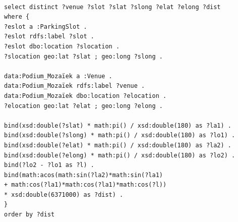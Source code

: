 \documentclass[runningheads,a4paper]{../../StyleFiles/llncs}
\begin{document}
\begin{lstlisting}[captionpos=b, caption=SPARQL query for getting parking spots close to Podium Mozaiek (sorted by distance), label=lst:sparql,
basicstyle=\ttfamily\small,frame=bt]

select distinct ?venue ?slot ?slat ?slong ?elat ?elong ?dist
where {
?eslot a :ParkingSlot .
?eslot rdfs:label ?slot .
?eslot dbo:location ?slocation .
?slocation geo:lat ?slat ; geo:long ?slong .

data:Podium_Mozaïek a :Venue .
data:Podium_Mozaïek rdfs:label ?venue .
data:Podium_Mozaïek dbo:location ?elocation .
?elocation geo:lat ?elat ; geo:long ?elong .

bind(xsd:double(?slat) * math:pi() / xsd:double(180) as ?la1) .
bind(xsd:double(?slong) * math:pi() / xsd:double(180) as ?lo1) .
bind(xsd:double(?elat) * math:pi() / xsd:double(180) as ?la2) .
bind(xsd:double(?elong) * math:pi() / xsd:double(180) as ?lo2) .
bind(?lo2 - ?lo1 as ?l) .
bind(math:acos(math:sin(?la2)*math:sin(?la1) 
+ math:cos(?la1)*math:cos(?la1)*math:cos(?l)) 
* xsd:double(6371000) as ?dist) .
}
order by ?dist

\end{lstlisting}
\end{document}
